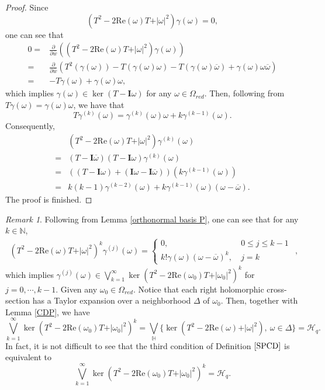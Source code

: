 \documentclass[pdflatex,sn-mathphys-num]{sn-jnl}%
\theoremstyle{thmstyleone}%
\theoremstyle{thmstyletwo}%
\newtheorem{remark}{Remark}%
\theoremstyle{thmstylethree}%
\theoremstyle{definition}
\theoremstyle{remark}
\newtheorem{remark}[theorem]{Remark}
\begin{document}
\begin{proof}
	 Since
	 \[
	 (T^2-2\mathrm{Re}(\omega)T+\vert\omega\vert^2)\gamma(\omega)=0,
	 \]
	 one can see that
 \[
	\begin{aligned}
		0=	& \frac{\partial}{\partial \overline{w}}\left((T^2-2\mathrm{Re}(\omega)T+\vert\omega\vert^2)\gamma(\omega)\right) \\
		= & \frac{\partial}{\partial \overline{w}}\left(T^2(\gamma(\omega))-T(\gamma(\omega)\omega)-T(\gamma(\omega)\overline{\omega})+\gamma(\omega)\omega \overline{\omega}\right) \\
		= & -T\gamma(\omega)+\gamma(\omega)\omega,
	\end{aligned}
	\]
	which implies  $\gamma(\omega)\in\ker(T-\boldsymbol{I}\omega)$ for any $\omega\in\Omega_{red}$.
	Then, following from $T\gamma(\omega)=\gamma(\omega)\omega$, we have that
	\[
	T\gamma^{(k)}(\omega)=\gamma^{(k)}(\omega)\omega+k\gamma^{(k-1)}(\omega).
	\]
Consequently,
	 \[
	 \begin{aligned}
	 	& (T^2-2\mathrm{Re}(\omega)T+\vert\omega\vert^2)\gamma^{(k)}(\omega) \\
	 	= & (T-\boldsymbol{I}\overline{\omega})(T-\boldsymbol{I}\omega)\gamma^{(k)}(\omega) \\
	 	= & ((T-\boldsymbol{I}\omega)+(\boldsymbol{I}\omega-\boldsymbol{I}\overline{\omega}))(k\gamma^{(k-1)}(\omega)) \\
	 	=& k(k-1)\gamma^{(k-2)}(\omega)+k\gamma^{(k-1)}(\omega)(\omega-\overline{\omega}).
	 \end{aligned}
	 \]
The proof is finished.
    \end{proof}
\begin{remark}\label{orthonormal basis PC}
Following from Lemma \ref{orthonormal basis P}, one can see that for any $k\in\mathbb{N}$,
\[
\begin{aligned}
(T^2-2\mathrm{Re}(\omega)T+\vert\omega\vert^2)^k\gamma^{(j)}(\omega)=
	\begin{cases}
		0,\ & 0\leq j\leq k-1 \\
		 k!\gamma(\omega)(\omega-\overline{\omega})^k,\ & j=k
	\end{cases}
\end{aligned},
\]
which implies $\gamma^{(j)}(\omega)\in\bigvee_{k=1}^{\infty}\ker(T^2-2\mathrm{Re}(\omega_0)T+\vert\omega_0\vert^2)^k$ for $j=0, \cdots, k-1$. Given any $\omega_0\in\Omega_{red}$. Notice that each right holomorphic cross-section has a Taylor expansion over a neighborhood $\Delta$ of $\omega_0$. Then, together with Lemma \ref{CDP}, we have
\[
\bigvee_{k=1}^{\infty}\ker(T^2-2\mathrm{Re}(\omega_0)T+\vert\omega_0\vert^2)^k=\bigvee_{\mathbb{H}}\{\ker(T^2-2\mathrm{Re}(\omega)+\vert\omega\vert^2),\ \omega\in\Delta\}=\mathcal{H}_q.
\]
In fact, it is not difficult to see that the third condition of Definition $\ref{SPCD}$ is equivalent to
\[
\bigvee_{k=1}^{\infty}\ker(T^2-2\mathrm{Re}(\omega_0)T+\vert\omega_0\vert^2)^k=\mathcal{H}_q.
\]
\end{remark}
\end{document}
